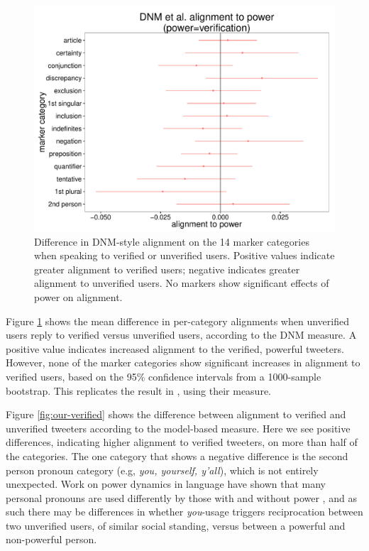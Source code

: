 \documentclass{acm_proc_article-sp}
\begin{document}
\begin{figure}
\centering
\includegraphics[width=.9\columnwidth]{graphics/www2016_dnmpowerdiff_verif.pdf}
\caption{Difference in DNM-style alignment on the 14 marker categories when speaking to verified or unverified users. Positive values indicate greater alignment to verified users; negative indicates greater alignment to unverified users. No markers show significant effects of power on alignment.}\label{fig:dnm-verified}
\end{figure}

Figure \ref{fig:dnm-verified} shows the mean difference in per-category alignments when unverified users reply to verified versus unverified users, according to the DNM measure.  A positive value indicates increased alignment to the verified, powerful tweeters.  However, none of the marker categories show significant increases in alignment to verified users, based on the 95\% confidence intervals from a 1000-sample bootstrap.  This replicates the result in \cite{DNMGamonDumais2011}, using their measure.

Figure \ref{fig:our-verified} shows the difference between alignment to verified and unverified tweeters according to the model-based measure. Here we see positive differences, indicating higher alignment to verified tweeters, on more than half of the categories.  The one category that shows a negative difference is the second person pronoun category (e.g, \textit{you, yourself, y'all}), which is not entirely unexpected. Work on power dynamics in language have shown that many personal pronouns are used differently by those with and without power \cite{KacewiczEtAl2013,ChungPennebaker2007}, and as such there may be differences in whether \textit{you}-usage triggers reciprocation between two unverified users, of similar social standing, versus between a powerful and non-powerful person.
\end{document}
